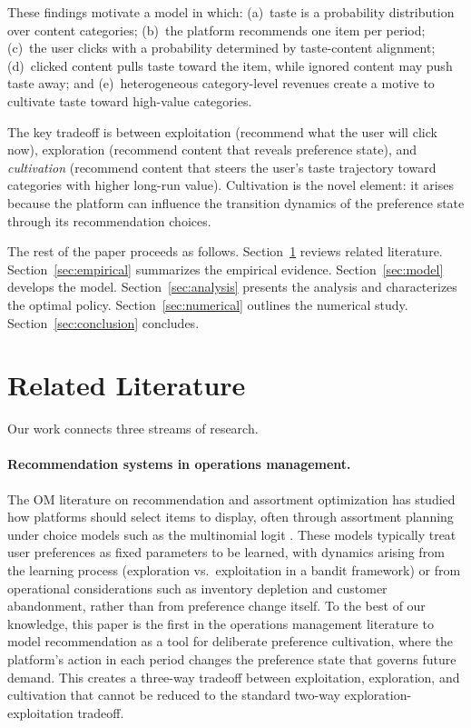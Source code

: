 \documentclass[11pt]{article}
\begin{document}
These findings motivate a model in which: (a)~taste is a probability distribution over content categories; (b)~the platform recommends one item per period; (c)~the user clicks with a probability determined by taste-content alignment; (d)~clicked content pulls taste toward the item, while ignored content may push taste away; and (e)~heterogeneous category-level revenues create a motive to cultivate taste toward high-value categories.

The key tradeoff is between exploitation (recommend what the user will click now), exploration (recommend content that reveals preference state), and \emph{cultivation} (recommend content that steers the user's taste trajectory toward categories with higher long-run value). Cultivation is the novel element: it arises because the platform can influence the transition dynamics of the preference state through its recommendation choices.

The rest of the paper proceeds as follows. Section~\ref{sec:lit} reviews related literature. Section~\ref{sec:empirical} summarizes the empirical evidence. Section~\ref{sec:model} develops the model. Section~\ref{sec:analysis} presents the analysis and characterizes the optimal policy. Section~\ref{sec:numerical} outlines the numerical study. Section~\ref{sec:conclusion} concludes.

\section{Related Literature}
\label{sec:lit}

Our work connects three streams of research.

\paragraph{Recommendation systems in operations management.} The OM literature on recommendation and assortment optimization has studied how platforms should select items to display, often through assortment planning under choice models such as the multinomial logit \citep[e.g.,][]{rusmevichientong2010dynamic, saure2013optimal, agrawal2019mnl}. These models typically treat user preferences as fixed parameters to be learned, with dynamics arising from the learning process (exploration vs.\ exploitation in a bandit framework) or from operational considerations such as inventory depletion and customer abandonment, rather than from preference change itself. To the best of our knowledge, this paper is the first in the operations management literature to model recommendation as a tool for deliberate preference cultivation, where the platform's action in each period changes the preference state that governs future demand. This creates a three-way tradeoff between exploitation, exploration, and cultivation that cannot be reduced to the standard two-way exploration-exploitation tradeoff.
\end{document}
